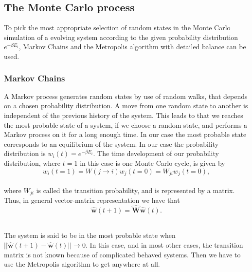 \documentclass[12pt]{article}
\begin{document}
\begin{flushleft}
\subsection{The Monte Carlo process}
To pick the most appropriate selection of random states in the Monte Carlo simulation of a evolving system according to the given probability distribution $e^{-\beta E_i}$, Markov Chains and the Metropolis algorithm with detailed balance can be used.
\subsubsection{Markov Chains}
A Markov process generates random states by use of random walks, that depends on a chosen probability distribution. A move from one random state to another is independent of the previous history of the system. This leads to that we reaches the most probable state of a system, if we choose a random state, and performs a Markov process on it for a long enough time. In our case the most probable state corresponds to an equilibrium of the system. 
In our case the probability distribution is $w_i(t) = e^{-\beta E_i}$. The time development of our probability distribution, where $t=1$ in this case is one Monte Carlo cycle, is given by
\vspace{5mm}
$$w_i(t=1) = W(j\rightarrow i)w_j(t=0) = W_{ji}w_j(t=0),$$\\
\vspace{5mm} 
where $W_{ji}$ is called the transition probability, and is represented by a matrix. Thus, in general vector-matrix representation we have that
\vspace{5mm}
$$\boldsymbol{\hat{w}}(t+1) = \boldsymbol{\hat{W}}\boldsymbol{\hat{w}}(t).$$\\
\vspace{5mm}

The system is said to be in the most probable state when $||\boldsymbol{\hat{w}}(t+1) -\boldsymbol{\hat{w}}(t)||\rightarrow 0$. In this case, and in most other cases, the transition matrix is not known because of complicated behaved systems. Then we have to use the Metropolis algorithm to get anywhere at all. 


\end{flushleft}
\end{document}
